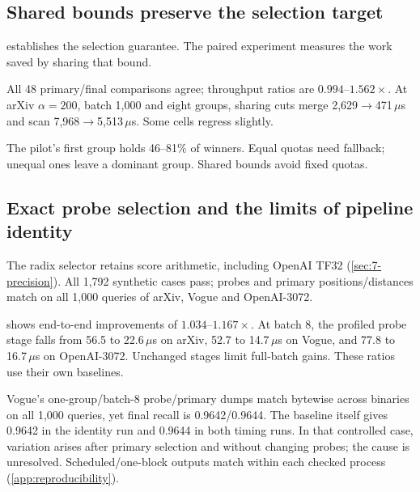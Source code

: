 \subsection{Shared bounds preserve the selection target}

 establishes the selection guarantee. The
paired experiment measures the work saved by sharing that bound.

All 48 primary/final comparisons agree; throughput ratios are $0.994$--$1.562\times$. At arXiv $\alpha=200$, batch 1,000 and eight groups, sharing cuts merge 2,629$\to$471\,$\mu$s and scan 7,968$\to$5,513\,$\mu$s. Some cells regress slightly.

The pilot's first group holds 46--81\% of winners. Equal quotas need fallback; unequal ones leave a dominant group. Shared bounds avoid fixed quotas.

\subsection{Exact probe selection and the limits of pipeline identity}

The radix selector retains score arithmetic, including OpenAI TF32 (\cref{sec:7-precision}). All 1,792 synthetic cases pass; probes and primary positions/distances match on all 1,000 queries of arXiv, Vogue and OpenAI-3072.

\begin{table}[tbp]
\centering
\caption[Probe-selection throughput ratios]{v69/v65 end-to-end throughput ratios for the exact computed-score probe
 change. Each workload--batch comparison has ten timing rounds per binary,
 collected in alternating runs. Ratios $>1$ favour v69.}
\label{tab:7-probe}
\small

\end{table}

 shows end-to-end improvements of $1.034$--$1.167\times$.
At batch 8, the profiled probe stage falls from 56.5 to 22.6\,$\mu$s
on arXiv, 52.7 to 14.7\,$\mu$s on Vogue, and 77.8 to 16.7\,$\mu$s
on OpenAI-3072. Unchanged stages limit full-batch gains. These ratios use their own baselines.

Vogue's one-group/batch-8 probe/primary dumps match bytewise across binaries on all 1,000 queries, yet final recall is 0.9642/0.9644. The baseline itself gives 0.9642 in the identity run and 0.9644 in both timing runs. In that controlled case, variation arises after primary selection and without changing probes; the cause is unresolved. Scheduled/one-block outputs match within each checked process (\cref{app:reproducibility}).

